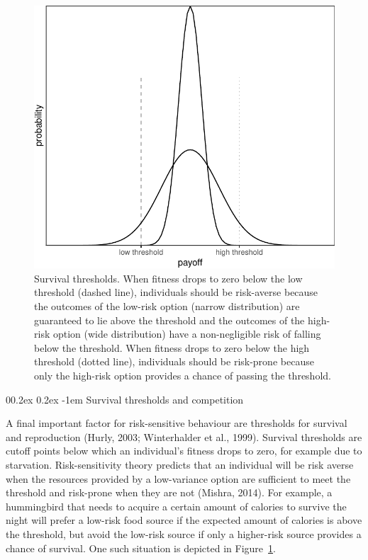 \documentclass[
  ,man,mask,floatsintext]{apa6}
\makeatletter
\let\oldparagraph\paragraph
\renewcommand{\paragraph}[1]{\oldparagraph{#1}\mbox{}}
\renewcommand{\paragraph}{\@startsection{paragraph}{4}{\parindent}%
  {0\baselineskip \@plus 0.2ex \@minus 0.2ex}%
  {-1em}%
  {\normalfont\normalsize\bfseries\itshape\typesectitle}}
\makeatother
\begin{document}
\begin{figure}

{\centering \includegraphics[width=0.6\linewidth]{rr-risk-sensitivity_files/figure-latex/varianceplot-1} 

}

\caption{Survival thresholds. When fitness drops to zero below the low threshold (dashed line), individuals should be risk-averse because the outcomes of the low-risk option (narrow distribution) are guaranteed to lie above the threshold and the outcomes of the high-risk option (wide distribution) have a non-negligible risk of falling below the threshold. When fitness drops to zero below the high threshold (dotted line), individuals should be risk-prone because only the high-risk option provides a chance of passing the threshold.}\label{fig:varianceplot}
\end{figure}

\hypertarget{survival-thresholds-and-competition}{%
\paragraph{Survival thresholds and competition}\label{survival-thresholds-and-competition}}

A final important factor for risk-sensitive behaviour are thresholds for survival and reproduction (Hurly, 2003; Winterhalder et al., 1999).
Survival thresholds are cutoff points below which an individual's fitness drops to zero, for example due to starvation.
Risk-sensitivity theory predicts that an individual will be risk averse when the resources provided by a low-variance option are sufficient to meet the threshold and risk-prone when they are not (Mishra, 2014).
For example, a hummingbird that needs to acquire a certain amount of calories to survive the night will prefer a low-risk food source if the expected amount of calories is above the threshold, but avoid the low-risk source if only a higher-risk source provides a chance of survival.
One such situation is depicted in Figure~\ref{fig:varianceplot}.
\end{document}
